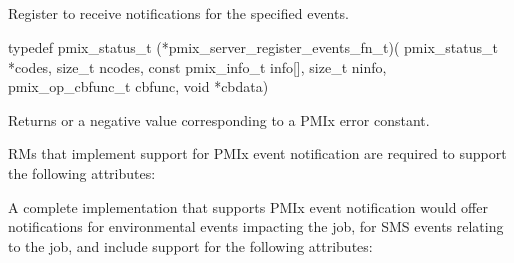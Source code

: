 \subsection{}

\summary

Register to receive notifications for the specified events.

\format

\cspecificstart
\begin{codepar}
 typedef pmix_status_t (*pmix_server_register_events_fn_t)(
                              pmix_status_t *codes, size_t ncodes,
                              const pmix_info_t info[], size_t ninfo,
                              pmix_op_cbfunc_t cbfunc, void *cbdata)
\end{codepar}
\cspecificend

\begin{arglist}
\end{arglist}

Returns  or a negative value corresponding to a PMIx error constant.

\reqattr
\acp{RM} that implement support for PMIx event notification are required to support the following attributes:


\optattr
A complete implementation that supports \ac{PMIx} event notification would offer notifications for environmental events impacting the job, for \ac{SMS} events relating to the job, and include support for the following attributes:


